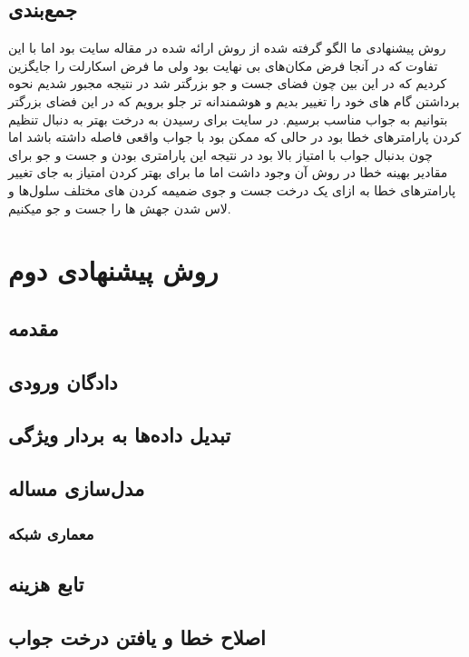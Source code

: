 \subsection{جمع‌بندی}
روش پیشنهادی ما الگو گرفته شده از روش ارائه شده در مقاله سایت بود اما با این تفاوت که در آنجا فرض مکان‌های بی نهایت بود ولی ما فرض اسکارلت را جایگزین کردیم که در این بین چون فضای جست و جو بزرگتر شد در نتیجه مجبور شدیم نحوه برداشتن گام های خود را تغییر بدیم و هوشمندانه تر جلو برویم که در این فضای بزرگتر بتوانیم به جواب مناسب برسیم. در سایت برای رسیدن به درخت بهتر به دنبال تنظیم کردن پارامترهای خطا بود در حالی که ممکن بود با جواب واقعی فاصله داشته باشد اما چون بدنبال جواب با امتیاز بالا بود در نتیجه این پارامتری بودن و جست و جو برای مقادیر بهینه خطا در روش آن وجود داشت اما ما برای بهتر کردن امتیاز به جای تغییر پارامترهای خطا به ازای یک درخت جست و جوی ضمیمه کردن های مختلف سلول‌ها و لاس شدن جهش ها را جست و جو میکنیم.

\section{روش پیشنهادی دوم}

\subsection{مقدمه}

\subsection{دادگان ورودی}

\subsection{تبدیل داده‌ها به بردار ویژگی}

\subsection{مدل‌سازی مساله}

\subsubsection{معماری شبکه}

\subsection{تابع هزینه}

\subsection{اصلاح خطا و یافتن درخت جواب}

